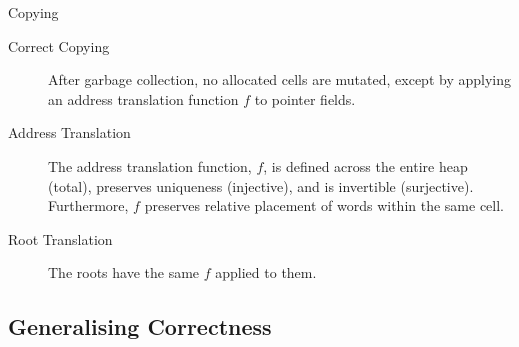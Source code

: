 \documentclass[usenames,dvipsnames]{beamer}
\begin{document}
\begin{frame}{Copying}
  \begin{description}
  \item[Correct Copying] After garbage collection, no allocated cells
    are mutated, except by applying an address translation function
    $f$ to pointer fields.

  \item[Address Translation] The address translation function, $f$, is
    defined across the entire heap (total), preserves uniqueness
    (injective), and is invertible (surjective). Furthermore, $f$
    preserves relative placement of words within the same cell.

  \item[Root Translation] The roots have the same $f$ applied to them.
  \end{description}

\end{frame}

\subsection{Generalising Correctness}
\end{document}
